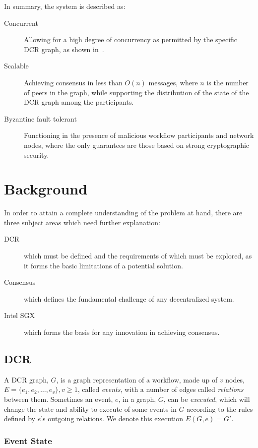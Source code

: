 \documentclass{article}
\begin{document}
	In summary, the system is described as:
	\begin{description}
		\item[Concurrent] Allowing for a high degree of concurrency as permitted by the specific DCR graph, as shown in~\cite{debois_concurrency_2015}.
        \item[Scalable] Achieving consensus in less than $O(n)$ messages, where $n$ is the number of peers in the graph, while supporting the distribution of the state of the DCR graph among the participants.
		\item[Byzantine fault tolerant] Functioning in the presence of malicious workflow participants and network nodes, where the only guarantees are those based on strong cryptographic security.
	\end{description}

\section{Background}

In order to attain a complete understanding of the problem at hand, there are three subject areas which need further explanation:
\begin{description}
	\item[DCR] which must be defined and the requirements of which must be explored, as it forms the basic limitations of a potential solution.
	\item[Consensus] which defines the fundamental challenge of any decentralized system.
	\item[Intel SGX] which forms the basis for any innovation in achieving consensus.
\end{description}

	\subsection{DCR}
	\label{subsec:dcr}

	A DCR graph, $G$, is a graph representation of a workflow, made up of $v$ nodes, $E=\{e_1, e_2, \dots, e_v\}, v \geq 1$,  called \textit{events}, with a number of edges called \textit{relations} between them.
	Sometimes an event, $e$, in a graph, $G$, can be \textit{executed}, which will change the state and ability to execute of some events in $G$ according to the rules defined by $e$'s outgoing relations.
	We denote this execution $E(G,e)=G'$.

			\subsubsection{Event State}
\end{document}
